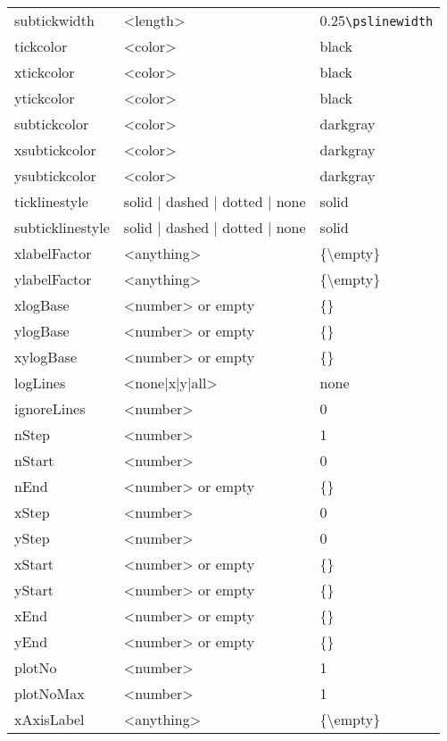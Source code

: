 {\begin{longtable}{lll}
subtickwidth         & <length>         & 0.25\verb+\pslinewidth+\\
tickcolor            & <color>          & black\\
xtickcolor           & <color>          & black\\
ytickcolor           & <color>          & black\\
subtickcolor         & <color>          & darkgray\\
xsubtickcolor        & <color>          & darkgray\\
ysubtickcolor        & <color>          & darkgray\\
ticklinestyle        & solid | dashed | dotted | none & solid\\
subticklinestyle        & solid | dashed | dotted | none & solid\\
xlabelFactor         & <anything> & \{\textbackslash\@ empty\}\\
ylabelFactor         & <anything> & \{\textbackslash\@ empty\}\\
xlogBase              & <number> or empty   & \{\}\\
ylogBase              & <number> or empty   & \{\}\\
xylogBase              & <number> or empty   & \{\}\\
logLines             & <none|x|y|all>   & none\\
ignoreLines          & <number>          & 0\\
nStep                & <number>          & 1\\
nStart               & <number>          & 0\\
nEnd                 & <number> or empty          & \{\}\\
xStep                & <number>          & 0\\
yStep               & <number>          & 0\\
xStart               & <number> or empty         & \{\}\\
yStart               & <number> or empty         & \{\}\\
xEnd               & <number> or empty         & \{\}\\
yEnd               & <number> or empty         & \{\}\\
plotNo            & <number>          & 1\\
plotNoMax         & <number>          & 1\\
xAxisLabel        & <anything> & \{\textbackslash\@ empty\}\\

\end{longtable}}
